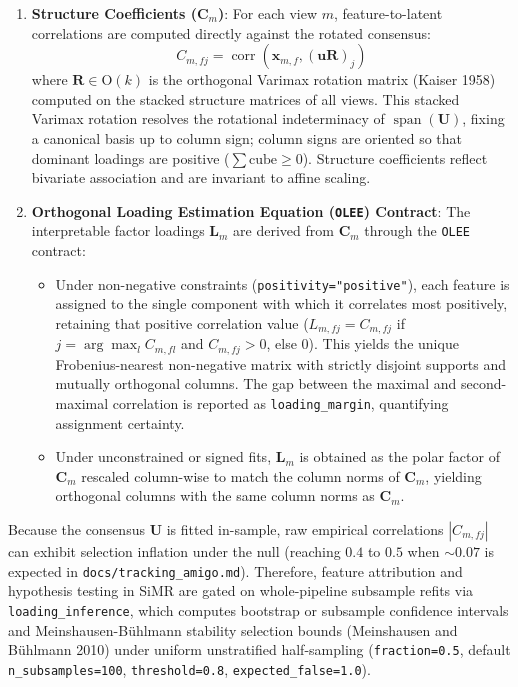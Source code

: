 \documentclass[
  10pt,
  letterpaper,
]{report}
\providecommand{\tightlist}{%
  \setlength{\itemsep}{0pt}\setlength{\parskip}{0pt}}
\begin{document}
\begin{enumerate}
\def\labelenumi{\arabic{enumi}.}
\tightlist
\item
  \textbf{Structure Coefficients (\(\mathbf{C}_m\))}: For each view
  \(m\), feature-to-latent correlations are computed directly against
  the rotated consensus: \[
  C_{m, fj} = \operatorname{corr}\!\left(\mathbf{x}_{m,f}, (\mathbf{u}\mathbf{R})_j\right)
  \] where \(\mathbf{R} \in \mathrm{O}(k)\) is the orthogonal Varimax
  rotation matrix (Kaiser 1958) computed on the stacked structure
  matrices of all views. This stacked Varimax rotation resolves the
  rotational indeterminacy of \(\operatorname{span}(\mathbf{U})\),
  fixing a canonical basis up to column sign; column signs are oriented
  so that dominant loadings are positive (\(\sum \text{cube} \ge 0\)).
  Structure coefficients reflect bivariate association and are invariant
  to affine scaling.
\item
  \textbf{Orthogonal Loading Estimation Equation (\texttt{OLEE})
  Contract}: The interpretable factor loadings \(\mathbf{L}_m\) are
  derived from \(\mathbf{C}_m\) through the \texttt{OLEE} contract:

  \begin{itemize}
  \tightlist
  \item
    Under non-negative constraints (\texttt{positivity="positive"}),
    each feature is assigned to the single component with which it
    correlates most positively, retaining that positive correlation
    value (\(L_{m, fj} = C_{m, fj}\) if \(j = \arg\max_l C_{m, fl}\) and
    \(C_{m, fj} > 0\), else \(0\)). This yields the unique
    Frobenius-nearest non-negative matrix with strictly disjoint
    supports and mutually orthogonal columns. The gap between the
    maximal and second-maximal correlation is reported as
    \texttt{loading\_margin}, quantifying assignment certainty.
  \item
    Under unconstrained or signed fits, \(\mathbf{L}_m\) is obtained as
    the polar factor of \(\mathbf{C}_m\) rescaled column-wise to match
    the column norms of \(\mathbf{C}_m\), yielding orthogonal columns
    with the same column norms as \(\mathbf{C}_m\).
  \end{itemize}
\end{enumerate}

Because the consensus \(\mathbf{U}\) is fitted in-sample, raw empirical
correlations \(|C_{m,fj}|\) can exhibit selection inflation under the
null (reaching \(0.4\) to \(0.5\) when \(\sim 0.07\) is expected in
\texttt{docs/tracking\_amigo.md}). Therefore, feature attribution and
hypothesis testing in SiMR are gated on whole-pipeline subsample refits
via \texttt{loading\_inference}, which computes bootstrap or subsample
confidence intervals and Meinshausen-Bühlmann stability selection bounds
(Meinshausen and Bühlmann 2010) under uniform unstratified half-sampling
(\texttt{fraction=0.5}, default \texttt{n\_subsamples=100},
\texttt{threshold=0.8}, \texttt{expected\_false=1.0}).
\end{document}
